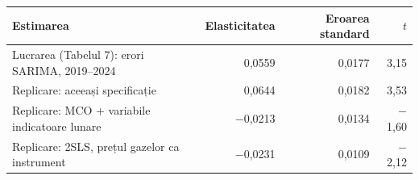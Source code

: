 \begin{tabular}{lrrr}
\toprule
Estimarea & Elasticitatea & Eroarea standard & $t$ \\
\midrule
Lucrarea (Tabelul 7): erori SARIMA, 2019--2024 & 0,0559 & 0,0177 & 3,15 \\
Replicare: aceeași specificație & 0,0644 & 0,0182 & 3,53 \\
Replicare: MCO + variabile indicatoare lunare & $-$0,0213 & 0,0134 & $-$1,60 \\
Replicare: 2SLS, prețul gazelor ca instrument & $-$0,0231 & 0,0109 & $-$2,12 \\
\bottomrule
\end{tabular}
